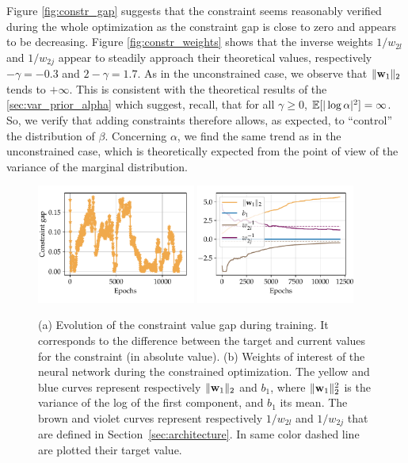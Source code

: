 Figure \ref{fig:constr_gap} suggests that the constraint seems reasonably verified during the whole optimization as the constraint gap is close to zero and appears to be decreasing. Figure \ref{fig:constr_weights} shows that the inverse weights $1/w_{2l}$ and $1/w_{2j}$ appear to steadily approach their theoretical values, respectively $-\gamma=-0.3$ and $2-\gamma = 1.7$. As in the unconstrained case, we observe that $\|\mathbf{w}_1\|_2$ tends to $+\infty$. This is consistent with the theoretical results of the \ref{sec:var_prior_alpha} which suggest, recall, that for all $\gamma\geq0$, $\mathbb{E}[|\log\alpha|^2]=\infty$. So, we verify that adding constraints therefore allows, as expected, to ``control'' the distribution of $\beta$. Concerning $\alpha$, we find the same trend as in the unconstrained case, which is theoretically expected from the point of view of the variance of the marginal distribution.


\begin{figure}[h]
    \centering
    {\includegraphics[width=5.2cm]{figures/constr-frags/constraint gap.pdf}}
    {\includegraphics[width=5.2cm]{figures/constr-frags/weights_constr.pdf}}
  \caption{(a) Evolution of the constraint value gap during training. It corresponds to the difference between the target and current values for the constraint (in absolute value). (b) Weights of interest of the neural network during the constrained optimization. The yellow and blue curves represent respectively $\|\mathbf{w}_1 \|_2$ and $b_1$, where $\|\mathbf{w}_1 \|_2^2$ is the variance of the log of the first component, and $b_1$ its mean. The brown and violet curves represent respectively $1/w_{2l}$ and $1/w_{2j}$ that are defined in Section~\ref{sec:architecture}. In same color dashed line are plotted their target value.}
\label{fig:constr_gap_weights}    
\end{figure}

